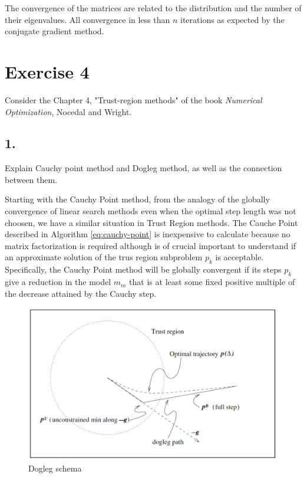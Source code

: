 \documentclass[unicode,11pt,a4paper,oneside,numbers=endperiod,openany]{scrartcl}
\begin{document}
The convergence of the matrices are related to the distribution and the number of their 
eigenvalues.
All convergence in less than $n$ iterations as expected by the conjugate gradient method. 

\clearpage
\section*{Exercise 4}
Consider the Chapter 4, "Trust-region methods" of the book \textit{Numerical Optimization},
Nocedal and Wright.

\subsection*{1.}
Explain  Cauchy point method and Dogleg method, as well as the connection between them.

Starting with the Cauchy Point method,
from the analogy of the globally convergence of linear search methods
even when the optimal step length was not choosen, 
we have a similar situation in Trust Region methods.
The Cauche Point described in Algorithm \ref{eq:cauchy-point} is inexpensive to calculate 
because no matrix factorization is required
although is of crucial important to understand if an approximate solution of the trus region 
subproblem $p_k$ is acceptable.
Specifically, the Cauchy Point method will be globally convergent if its steps $p_k$ 
give a reduction in the model $m_m$ that is at least some fixed positive multiple of the
decrease attained by the Cauchy step.

\begin{figure}[htbp]
\centering
\caption{Dogleg schema}
\label{fig:dogleg-schema}
\includegraphics[width=\textwidth, trim={0cm 0cm 0cm 0cm}]{./figures/dogleg-schema.png}
\end{figure}
\end{document}
